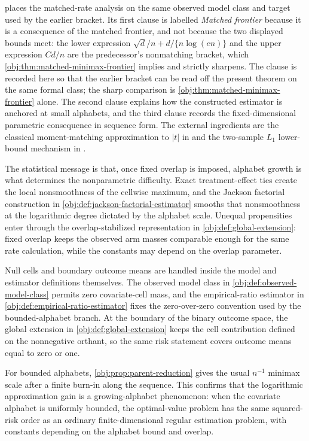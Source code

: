  places the matched-rate analysis on the same observed model class and target used by the earlier bracket. Its first clause is labelled \emph{Matched frontier} because it is a consequence of the matched frontier, and not because the two displayed bounds meet: the lower expression \(\sqrt d/n+d/\{n\log(en)\}\) and the upper expression \(Cd/n\) are the predecessor's nonmatching bracket, which \cref{obj:thm:matched-minimax-frontier} implies and strictly sharpens. The clause is recorded here so that the earlier bracket can be read off the present theorem on the same formal class; the sharp comparison is \cref{obj:thm:matched-minimax-frontier} alone. The second clause explains how the constructed estimator is anchored at small alphabets, and the third clause records the fixed-dimensional parametric consequence in sequence form. The external ingredients are the classical moment-matching approximation to \(|t|\) in \citet[Lemma 1 and Section 3.1]{CaiLow2011L1} and the two-sample \(L_1\) lower-bound mechanism in \citet[Theorem 3, equation (24)]{JiaoHanWeissman2018L1}.

The statistical message is that, once fixed overlap is imposed, alphabet growth is what determines the nonparametric difficulty. Exact treatment-effect ties create the local nonsmoothness of the cellwise maximum, and the Jackson factorial construction in \cref{obj:def:jackson-factorial-estimator} smooths that nonsmoothness at the logarithmic degree dictated by the alphabet scale. Unequal propensities enter through the overlap-stabilized representation in \cref{obj:def:global-extension}: fixed overlap keeps the observed arm masses comparable enough for the same rate calculation, while the constants may depend on the overlap parameter.

Null cells and boundary outcome means are handled inside the model and estimator definitions themselves. The observed model class in \cref{obj:def:observed-model-class} permits zero covariate-cell mass, and the empirical-ratio estimator in \cref{obj:def:empirical-ratio-estimator} fixes the zero-over-zero convention used by the bounded-alphabet branch. At the boundary of the binary outcome space, the global extension in \cref{obj:def:global-extension} keeps the cell contribution defined on the nonnegative orthant, so the same risk statement covers outcome means equal to zero or one.

For bounded alphabets, \cref{obj:prop:parent-reduction} gives the usual \(n^{-1}\) minimax scale after a finite burn-in along the sequence. This confirms that the logarithmic approximation gain is a growing-alphabet phenomenon: when the covariate alphabet is uniformly bounded, the optimal-value problem has the same squared-risk order as an ordinary finite-dimensional regular estimation problem, with constants depending on the alphabet bound and overlap.


